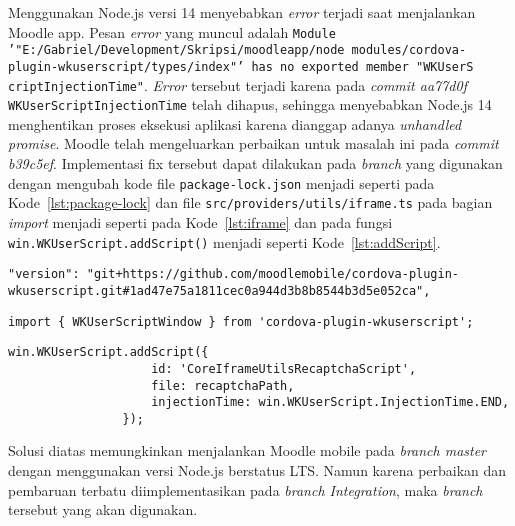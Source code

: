 Menggunakan Node.js versi 14 menyebabkan \textit{error} terjadi saat menjalankan Moodle app. Pesan \textit{error} yang muncul adalah \texttt{Module '"E:/Gabriel/Development/Skripsi/moodleapp/node \textunderscore modules/cordova-plugin-wkuserscript/types/index"' has no exported member "WKUserS \\ criptInjectionTime"}. \textit{Error} tersebut terjadi karena pada \textit{commit aa77d0f} \texttt{WKUserScriptInjectionTime} telah dihapus\cite{moodleapp:git:wkuserscript}, sehingga menyebabkan Node.js 14 menghentikan proses eksekusi aplikasi karena dianggap adanya \textit{unhandled promise}. Moodle telah mengeluarkan perbaikan untuk masalah ini pada \textit{commit b39c5ef}\cite{moodleapp:git:wkuserscriptfix}. Implementasi fix tersebut dapat dilakukan pada \textit{branch} yang digunakan dengan mengubah kode file \texttt{package-lock.json} menjadi seperti pada \mbox{Kode \ref{lst:package-lock}} dan file \texttt{src/providers/utils/iframe.ts} pada bagian \textit{import} menjadi seperti pada \mbox{Kode \ref{lst:iframe}} dan pada fungsi \texttt{win.WKUserScript.addScript()} menjadi seperti \mbox{Kode \ref{lst:addScript}}.

\begin{lstlisting}[frame=single, label ={lst:package-lock}, caption = Perbaikan pada \texttt{package-lock.json} ]
	"version": "git+https://github.com/moodlemobile/cordova-plugin-wkuserscript.git#1ad47e75a1811cec0a944d3b8b8544b3d5e052ca",
\end{lstlisting}
 
\begin{lstlisting}[frame=single, label={lst:iframe}, caption = Perbaikan pada bagian \textit{import} file \texttt{iframe.ts}]
	import { WKUserScriptWindow } from 'cordova-plugin-wkuserscript';
\end{lstlisting}

\begin{lstlisting}[frame=single, label={lst:addScript}, caption = Perbaikan pada bagian fungsi \texttt{win.WKUserScript.addScript()} file \texttt{iframe.ts}]
	        	win.WKUserScript.addScript({
                    id: 'CoreIframeUtilsRecaptchaScript',
                    file: recaptchaPath,
                    injectionTime: win.WKUserScript.InjectionTime.END,
                });
\end{lstlisting}

Solusi diatas memungkinkan menjalankan Moodle mobile pada \textit{branch master} dengan menggunakan versi Node.js berstatus LTS. Namun karena perbaikan dan pembaruan terbatu diimplementasikan pada \textit{branch Integration}, maka \textit{branch} tersebut yang akan digunakan. 

